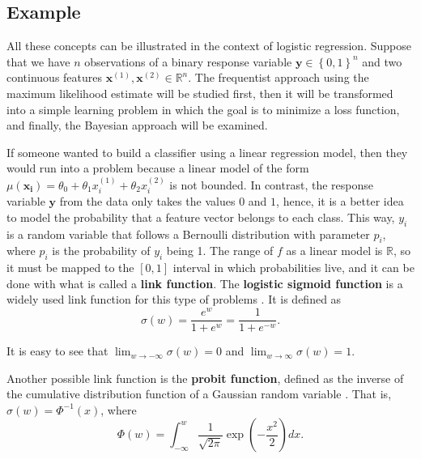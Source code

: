 \subsection{Example}

All these concepts can be illustrated in the context of logistic regression. Suppose that we have $n$ observations of a binary response variable $\boldsymbol{y} \in \left\{0, 1\right\}^n$ and two continuous features $\boldsymbol{x}^{(1)}, \boldsymbol{x}^{(2)} \in \mathbb{R}^n$. The frequentist approach using the maximum likelihood estimate will be studied first, then it will be transformed into a simple learning problem in which the goal is to minimize a loss function, and finally, the Bayesian approach will be examined.

If someone wanted to build a classifier using a linear regression model, then they would run into a problem because a linear model of the form $\mu(\boldsymbol{x_i}) = \theta_0 + \theta_1 x_i^{(1)} + \theta_2 x_i^{(2)}$ is not bounded. In contrast, the response variable $\boldsymbol{y}$ from the data only takes the values $0$ and $1$, hence, it is a better idea to model the probability that a feature vector belongs to each class. This way, $y_i$ is a random variable that follows a Bernoulli distribution with parameter $p_i$, where $p_i$ is the probability of $y_i$ being 1.
The range of $f$ as a linear model is $\mathbb{R}$, so it must be mapped to the $\left[ 0,1 \right]$ interval in which probabilities live, and it can be done with what is called a \textbf{link function}. The \textbf{logistic sigmoid function} %
is a widely used link function for this type of problems \cite[p.~114]{christopher2006pattern}. It is defined as
\begin{equation}
  \sigma(w) = \frac{e^w}{1 + e^w} = \frac{1}{1 + e^{-w}}.
\end{equation}

It is easy to see that $\lim_{w \to -\infty} \sigma(w) = 0$ and $\lim_{w \to \infty} \sigma(w) = 1$.


Another possible link function is the \textbf{probit function}, defined as the inverse of the cumulative distribution function of a Gaussian random variable \cite[p.~296]{friedman2001elements}. That is, $\sigma(w) = \Phi^{-1}\left( x \right)$,
where
\begin{equation}
  \Phi(w) = \int_{-\infty}^w \frac{1}{\sqrt{2 \pi}} \exp{\left( -\frac{x^2}{2} \right)} dx.
\end{equation}

